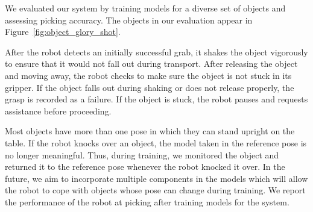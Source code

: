 \documentclass[graybox]{svmult}
\begin{document}
We evaluated our system by training models for a diverse set of
objects and assessing picking accuracy.  The objects in our evaluation
appear in Figure~\ref{fig:object_glory_shot}.

After the robot detects an initially successful grab, it shakes the
object vigorously to ensure that it would not fall out during
transport. After releasing the object and moving away, the robot
checks to make sure the object is not stuck in its gripper. If the
object falls out during shaking or does not release properly, the
grasp is recorded as a failure. If the object is stuck, the robot
pauses and requests assistance before proceeding.

Most objects have more than one pose in which they can stand upright
on the table. If the robot knocks over an object, the model taken in
the reference pose is no longer meaningful. Thus, during training, we
monitored the object and returned it to the reference pose whenever
the robot knocked it over. In the future, we aim to incorporate
multiple components in the models which will allow the robot to cope
with objects whose pose can change during training.  We report the
performance of the robot at picking after training models for the
system.
\end{document}
